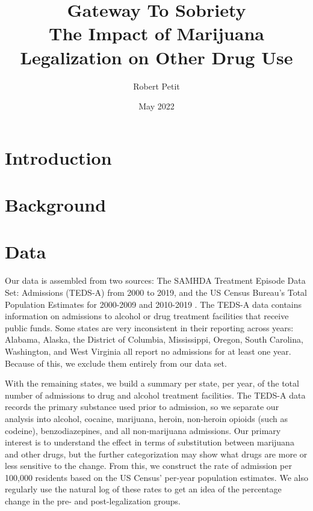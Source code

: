 \documentclass{article}
\title{Gateway To Sobriety \\
    \large The Impact of Marijuana Legalization on Other Drug Use}
\author{Robert Petit}
\date{May 2022}
\begin{document}
\maketitle

\section{Introduction}



\section{Background}

\section{Data}

Our data is assembled from two sources: The SAMHDA Treatment Episode Data Set: Admissions (TEDS-A) \cite{TEDS} from 2000 to 2019, and the US Census Bureau's Total Population Estimates for 2000-2009 \cite{USCen09} and 2010-2019 \cite{USCen19}. The TEDS-A data contains information on admissions to alcohol or drug treatment facilities that receive public funds. Some states are very inconsistent in their reporting across years:  Alabama, Alaska, the District of Columbia,  Mississippi, Oregon, South Carolina, Washington, and West Virginia all report no admissions for at least one year. Because of this, we exclude them entirely from our data set. 

With the remaining states, we build a summary per state, per year, of the total number of admissions to drug and alcohol treatment facilities. The TEDS-A data records the primary substance used prior to admission, so we separate our analysis into alcohol, cocaine, marijuana, heroin, non-heroin opioids (such as codeine), benzodiazepines, and all non-marijuana admissions. Our primary interest is to understand the effect in terms of substitution between marijuana and other drugs, but the further categorization may show what drugs are more or less sensitive to the change. From this, we construct the rate of admission per 100,000 residents based on the US Census' per-year population estimates. We also regularly use the natural log of these rates to get an idea of the percentage change in the pre- and post-legalization groups.
\end{document}
